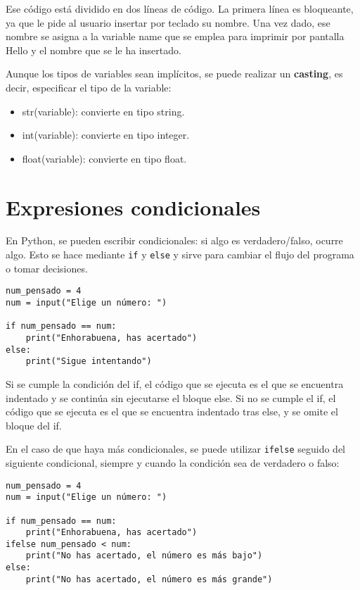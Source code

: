 Ese código está dividido en dos líneas de código. La primera línea es bloqueante, ya que le pide al usuario insertar por teclado su nombre. Una vez dado, ese nombre se asigna a la variable name que se emplea para imprimir por pantalla Hello y el nombre que se le ha insertado. 

Aunque los tipos de variables sean implícitos, se puede realizar un \textbf{casting}, es decir, especificar el tipo de la variable:
\begin{itemize}
\item str(variable): convierte en tipo string.
\item int(variable): convierte en tipo integer.
\item float(variable): convierte en tipo float.
\end{itemize}

\section{Expresiones condicionales}
En Python, se pueden escribir condicionales: si algo es verdadero/falso, ocurre algo. Esto se hace mediante \texttt{if} y \texttt{else} y sirve para cambiar el flujo del programa o tomar decisiones.

\begin{lstlisting}
num_pensado = 4
num = input("Elige un número: ")

if num_pensado == num:
	print("Enhorabuena, has acertado")
else:
	print("Sigue intentando")
\end{lstlisting}

Si se cumple la condición del if, el código que se ejecuta es el que se encuentra indentado y se continúa sin ejecutarse el bloque else. Si no se cumple el if, el código que se ejecuta es el que se encuentra indentado tras else, y se omite el bloque del if. 

En el caso de que haya más condicionales, se puede utilizar \texttt{ifelse} seguido del siguiente condicional, siempre y cuando la condición sea de verdadero o falso:

\begin{lstlisting}
num_pensado = 4
num = input("Elige un número: ")

if num_pensado == num:
	print("Enhorabuena, has acertado")
ifelse num_pensado < num:
	print("No has acertado, el número es más bajo")
else:
	print("No has acertado, el número es más grande")
\end{lstlisting}

